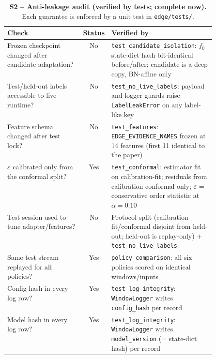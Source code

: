 \begin{table}[t]
  \centering
  \caption{\textbf{S2 -- Anti-leakage audit (verified by tests; complete now).}
  Each guarantee is enforced by a unit test in \texttt{edge/tests/}.}
  \label{tab:edge-s2}
  \small
  \begin{tabular}{@{}l c >{\raggedright\arraybackslash}p{0.50\linewidth}@{}}
    \toprule
    Check & Status & Verified by \\
    \midrule
    Frozen checkpoint changed after candidate adaptation? & No
      & \texttt{test\_candidate\_isolation}: $f_0$ state-dict hash bit-identical before/after; candidate is a deep copy, BN-affine only \\
    Test/held-out labels accessible to live runtime? & No
      & \texttt{test\_no\_live\_labels}: payload and logger guards raise \texttt{LabelLeakError} on any label-like key \\
    Feature schema changed after test lock? & No
      & \texttt{test\_features}: \texttt{EDGE\_EVIDENCE\_NAMES} frozen at 14 features (first 11 identical to the paper) \\
    $\varepsilon$ calibrated only from the conformal split? & Yes
      & \texttt{test\_conformal}: estimator fit on calibration-fit; residuals from calibration-conformal only; $\varepsilon$ = conservative order statistic at $\alpha{=}0.10$ \\
    Test session used to tune adapter/features? & No
      & Protocol split (calibration-fit/conformal disjoint from held-out; held-out is replay-only) $+$ \texttt{test\_no\_live\_labels} \\
    Same test stream replayed for all policies? & Yes
      & \texttt{policy\_comparison}: all six policies scored on identical windows/inputs \\
    Config hash in every log row? & Yes
      & \texttt{test\_log\_integrity}: \texttt{WindowLogger} writes \texttt{config\_hash} per record \\
    Model hash in every log row? & Yes
      & \texttt{test\_log\_integrity}: \texttt{WindowLogger} writes \texttt{model\_version} (= state-dict hash) per record \\
    \bottomrule
  \end{tabular}
\end{table}

